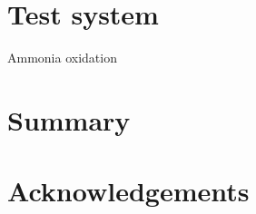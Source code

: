 \documentclass[aip,rsi]{revtex4-1}
\begin{document}
\section{Test system}
Ammonia oxidation


\section{Summary}

\section{Acknowledgements}


%
%

%



%
%

\end{document}
